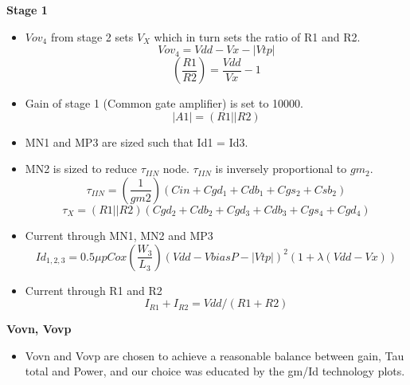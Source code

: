 \documentclass[12pt,a4paper]{article}
\begin{document}
\textbf{Stage 1}

\begin{itemize}
	\item $Vov_4$ from stage 2 sets $V_X$ which in turn sets the ratio of R1 and R2.
	\begin{equation}
		Vov_4=Vdd-Vx-|Vtp|
	\end{equation}
	\begin{equation}
		(\frac{R1}{R2})=\frac{Vdd}{Vx}-1
	\end{equation}
	\item Gain of stage 1 (Common gate amplifier) is set to 10000.
	\begin{equation}
		|A1|=(R1 || R2)
	\end{equation}
	\item MN1 and MP3 are sized such that Id1 = Id3.
	\item MN2 is sized to reduce $\tau_{IIN}$ node.  $\tau_{IIN}$ is inversely proportional to $gm_2$.
	\begin{equation}
		\tau_{IIN}=(\frac{1}{gm2})(Cin+Cgd_1+Cdb_1+Cgs_2+Csb_2)
	\end{equation}
	\begin{equation}
		\tau_{X}=(R1 || R2)(Cgd_2+Cdb_2+Cgd_3+Cdb_3+Cgs_4+Cgd_4)
	\end{equation}
\end{itemize}





\begin{itemize}
	\item Current through MN1, MN2 and MP3
	\begin{equation}
		Id_{1,2,3}=0.5\mu pCox(\frac{W_3}{L_3})(Vdd-VbiasP-|Vtp|)^{2} (1+\lambda (Vdd-Vx))
	\end{equation}
	\item Current through R1 and R2
	\begin{equation}
		I_{R1}+I_{R2}=Vdd/(R1+R2)
	\end{equation}
\end{itemize}

\textbf{Vovn, Vovp}

\begin{itemize}
	\item Vovn and Vovp are chosen to achieve a reasonable balance between gain, Tau total and Power, and our choice was educated by the gm/Id technology plots.
\end{itemize}
	
\end{document}

